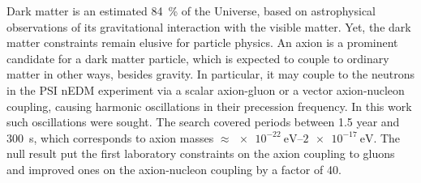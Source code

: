 Dark matter is an estimated \SI{84}{\percent} of the Universe, based on astrophysical observations of its gravitational interaction with the visible matter. Yet, the dark matter constraints remain elusive for particle physics. An axion is a prominent candidate for a dark matter particle, which is expected to couple to ordinary matter in other ways, besides gravity. In particular, it may couple to the neutrons in the PSI nEDM experiment via a scalar axion-gluon or a vector axion-nucleon coupling, causing harmonic oscillations in their precession frequency. In this work such oscillations were sought. The search covered periods between \num{1.5} year and \SI{300}{\second}, which corresponds to axion masses $\approx \SIrange[range-phrase=--]{e-22}{2e-17}{\electronvolt}$. The null result put the first laboratory constraints on the axion coupling to gluons and improved ones on the axion-nucleon coupling by a factor of 40.

\enlargethispage{2\baselineskip}

\endgroup			

\vfill
